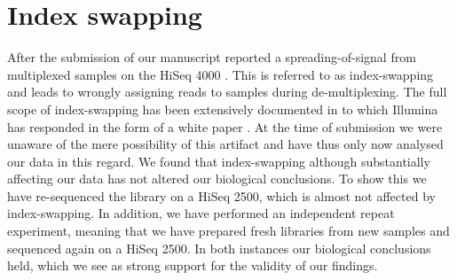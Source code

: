 \documentclass{article}
\begin{document}


\section*{Index swapping}
After the submission of our manuscript \citeauthor{Sinha2017} reported a spreading-of-signal from multiplexed samples on the HiSeq 4000 \autocite{Sinha2017}.
This is referred to as index-swapping and leads to wrongly assigning reads to samples during de-multiplexing.
The full scope of index-swapping has been extensively documented in \autocite{Sinha2017} to which Illumina has responded in the form of a white paper \autocite{Illumina}.
At the time of submission we were unaware of the mere possibility of this artifact and have thus only now analysed our data in this regard.
We found that index-swapping although substantially affecting our data has not altered our biological conclusions.
To show this we have re-sequenced the library on a HiSeq 2500, which is almost not affected by index-swapping.
In addition, we have performed an independent repeat experiment, meaning that we have prepared fresh libraries from new samples and sequenced again on a HiSeq 2500.
In both instances our biological conclusions held, which we see as strong support for the validity of our findings.

\end{document}
